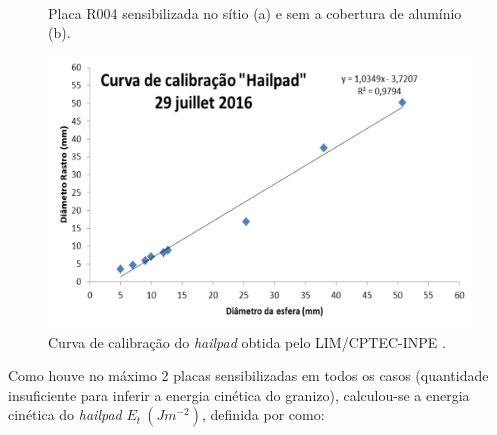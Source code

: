 \begin{figure}[htb]
	\begin{center}
		\caption{Placa R004 sensibilizada no sítio (a) e sem a cobertura de alumínio (b).} 
		\label{hailpad_exemplo}
		\quad
		\\
	\end{center}
\end{figure}

\begin{figure}[htb]
	\begin{center}
		\caption{Curva de calibração do \textit{hailpad} obtida pelo LIM/CPTEC-INPE \cite{ThomazJunior2016}.} 
		\label{calibracao_hailpad}
		\includegraphics[width=0.7\columnwidth]{figs/calibracao_hailpad.png}
	\end{center}
\end{figure}

Como houve no máximo 2 placas sensibilizadas em todos os casos (quantidade insuficiente para inferir a energia cinética do granizo), calculou-se a energia cinética do \textit{hailpad} $E_t\:(Jm^{-2})$, definida por  como:


